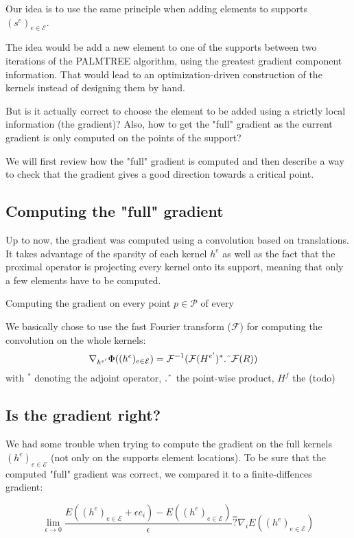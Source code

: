 Our idea is to use the same principle when adding elements to supports $(s^e)_{e \in \mathcal{E}}$.

The idea would be add a new element to one of the supports between two iterations of the PALMTREE algorithm, using the greatest gradient component information. That would lead to an optimization-driven construction of the kernels instead of designing them by hand.

But is it actually correct to choose the element to be added using a strictly local information (the gradient)? Also, how to get the "full" gradient as the current gradient is only computed on the points of the support?

We will first review how the "full" gradient is computed and then describe a way to check that the gradient gives a good direction towards a critical point.

\subsection{Computing the "full" gradient}
Up to now, the gradient was computed using a convolution based on translations. It takes advantage of the sparsity of each kernel $h^e$ as well as the fact that the proximal operator is projecting every kernel onto its support, meaning that only a few elements have to be computed.



Computing the gradient on every point $p \in \mathcal{P}$ of every 

We basically chose to use the fast Fourier transform ($\mathcal{F}$) for computing the convolution on the whole kernels:
\begin{align*}
	\nabla_{h^{e'}} \Phi((h^e)_{e \in \mathcal{E}})&= \mathcal{F}^{-1}(\mathcal{F}(H^{{e'}})^* \text{.\^{}} \mathcal{F}(R))
\end{align*}
with ${}^*$ denoting the adjoint operator, $\text{.\^{}}$ the point-wise product, $H^{f}$ the (todo) %

\subsection{Is the gradient right?}
We had some trouble when trying to compute the gradient on the full kernels $(h^e)_{e \in \mathcal{E}}$ (not only on the supports element locations). To be sure that the computed "full" gradient was correct, we compared it to a finite-diffences gradient:

$$\lim_{\epsilon \rightarrow 0} \frac{E((h^e)_{e \in \mathcal{E}}+\epsilon e_i) - E((h^e)_{e \in \mathcal{E}}) }{\epsilon} \overset{=}{?} \nabla_i E((h^e)_{e \in \mathcal{E}})$$

